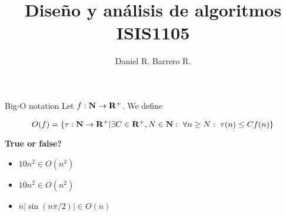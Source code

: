 \documentclass{beamer}
\title{Diseño y análisis de algoritmos \\ ISIS1105}
\author{Daniel R. Barrero R.}
\institute{Universidad de los Andes}
\begin{document}
\frame{\titlepage}

%

\begin{frame}{Big-O notation}
	Let $f : \mathbf{N} \to \mathbf{R}^+$. We define

	\begin{equation*}
		O(f) = \{\tau : \mathbf{N} \to \mathbf{R}^+ | \exists C \in \mathbf{R}^+, N \in \mathbf{N}:
		\ \forall n \geq N:\ \tau(n) \leq Cf(n)\}
	\end{equation*}

	\textbf{True or false?}
	\begin{itemize}
		\item $10n^2 \in O(n^3)$
		\item $10n^2 \in O(n^2)$
		\item $n|\sin(n\pi/2)| \in O(n)$
	\end{itemize}
\end{frame}
\end{document}
